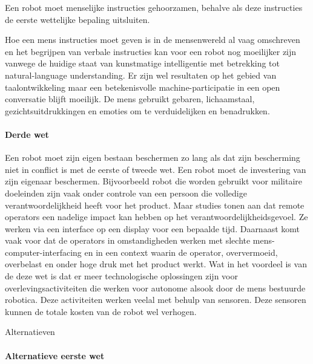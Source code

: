 \documentclass[11pt]{report}
\begin{document}
Een robot moet menselijke instructies gehoorzamen, behalve als deze instructies de eerste wettelijke bepaling uitsluiten.

Hoe een mens instructies moet geven is in de mensenwereld al vaag omschreven en het begrijpen van verbale instructies kan voor een robot nog moeilijker zijn vanwege de huidige staat van kunstmatige intelligentie met betrekking tot natural-language understanding. Er zijn wel resultaten op het gebied van taalontwikkeling maar een betekenisvolle machine-participatie in een open conversatie blijft moeilijk. De mens gebruikt gebaren, lichaamstaal, gezichtsuitdrukkingen en emoties om te verduidelijken en benadrukken.
\paragraph{Derde wet}

Een robot moet zijn eigen bestaan beschermen zo lang als dat zijn bescherming niet in conflict is met de eerste of tweede wet.
Een robot moet de investering van zijn eigenaar beschermen.
Bijvoorbeeld robot die worden gebruikt voor militaire doeleinden zijn vaak onder controle van een persoon die volledige verantwoordelijkheid heeft voor het product. Maar studies tonen aan dat remote operators een nadelige impact kan hebben op het verantwoordelijkheidsgevoel. Ze werken via een interface op een display voor een bepaalde tijd. Daarnaast komt vaak voor dat de operators in omstandigheden werken met slechte mens-computer-interfacing en in een context waarin de operator, oververmoeid, overbelast en onder hoge druk met het product werkt.
Wat in het voordeel is van de deze wet is dat er meer technologische oplossingen zijn voor overlevingsactiviteiten die werken voor autonome alsook door de mens bestuurde robotica. Deze activiteiten werken veelal met behulp van sensoren. Deze sensoren kunnen de totale kosten van de robot wel verhogen.

Alternatieven

\paragraph{Alternatieve eerste wet}
\end{document}
